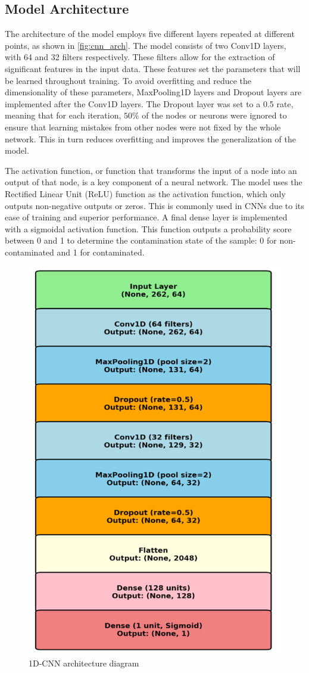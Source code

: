\documentclass[12pt]{report}
\renewcommand{\cite}{\supercite}
\begin{document}
\subsection{Model Architecture}

The architecture of the model employs five different layers repeated at different points, as shown in \autoref{fig:cnn_arch}. The model consists of two Conv1D layers, with 64 and 32 filters respectively. These filters allow for the extraction of significant features in the input data.\cite{nisha_2020_applications} These features set the parameters that will be learned throughout training. To avoid overfitting and reduce the dimensionality of these parameters, MaxPooling1D layers and Dropout layers are implemented after the Conv1D layers. The Dropout layer was set to a 0.5 rate, meaning that for each iteration, $50\%$ of the nodes or neurons were ignored to ensure that learning mistakes from other nodes were not fixed by the whole network.\cite{DropoutNeuralNetworksyadav2023} This in turn reduces overfitting and improves the generalization of the model.

The activation function, or function that transforms the input of a node into an output of that node, is a key component of a neural network. The model uses the Rectified Linear Unit (ReLU) function as the activation function, which only outputs non-negative outputs or zeros.\cite{brownlee_2019_a} This is commonly used in CNNs due to its ease of training and superior performance. A final dense layer is implemented with a sigmoidal activation function. This function outputs a probability score between 0 and 1 to determine the contamination state of the sample: 0 for non-contaminated and 1 for contaminated.\cite{saeed_2021_a} 

\begin{figure}[!h]
    \centering
    \includegraphics[width=0.4\linewidth]{Images/cnn_arch.png}
    \caption{1D-CNN architecture diagram}
    \label{fig:cnn_arch}
\end{figure}
\end{document}

